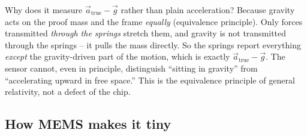 \begin{whybox}
Why does it measure $\vec a_{\text{true}}-\vec g$ rather than plain acceleration?
Because gravity acts on the proof mass and the frame \emph{equally} (equivalence
principle). Only forces transmitted \emph{through the springs} stretch them, and
gravity is not transmitted through the springs -- it pulls the mass directly. So the
springs report everything \emph{except} the gravity-driven part of the motion, which
is exactly $\vec a_{\text{true}} - \vec g$. The sensor cannot, even in principle,
distinguish ``sitting in gravity'' from ``accelerating upward in free space.'' This is
the equivalence principle of general relativity, not a defect of the chip.
\end{whybox}

\subsection{How MEMS makes it tiny}

